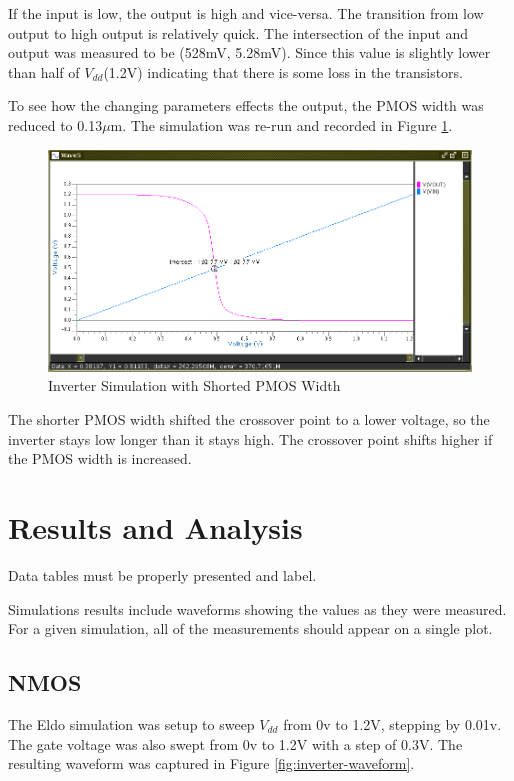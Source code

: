 \documentclass[11pt]{article}
\begin{document}
		If the input is low, the output is high and vice-versa. The transition from low output to high output is relatively quick. The intersection of the input and output was measured to be (528mV, 5.28mV). Since this value is slightly lower than half of $V_{dd}$(1.2V) indicating that there is some loss in the transistors. 
		
		To see how the changing parameters effects the output, the PMOS width was reduced to 0.13$\mu$m. The simulation was re-run and recorded in Figure \ref{fig:shorter-pmos-width}.
		
		\begin{figure}[H]
			\centering
			\includegraphics[width=0.7\linewidth]{"Pictures/Shorter PMOS Width"}
			\caption{Inverter Simulation with Shorted PMOS Width}
			\label{fig:shorter-pmos-width}
		\end{figure}
	
		The shorter PMOS width shifted the crossover point to a lower voltage, so the inverter stays low longer than it stays high. The crossover point shifts higher if the PMOS width is increased.
		

\section{Results and Analysis}

	Data tables must be properly presented and label.
	
	Simulations results include waveforms showing the values as they were measured. For a given simulation, all of the measurements should appear on a single plot.



	\subsection{NMOS}
	
		The Eldo simulation was setup to sweep $V_{dd}$ from 0v to 1.2V, stepping by 0.01v. The gate voltage was also swept from 0v to 1.2V with a step of 0.3V. The resulting waveform was captured in Figure \ref{fig:inverter-waveform}.
	
\end{document}
